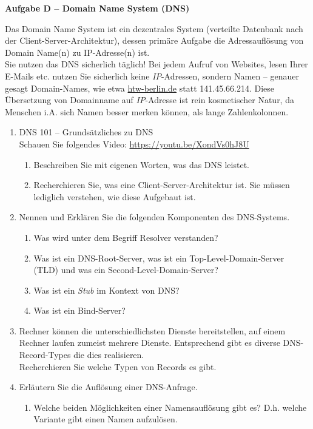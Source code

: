 \documentclass[paper=a4,fontsize=11pt]{scrartcl}%
\numberwithin{equation}{section}
\begin{document}
\begin{center}\Large{\textbf{Aufgabe D -- Domain Name System (DNS)}}\end{center}\vskip0.25in
Das Domain Name System ist ein dezentrales System (verteilte Datenbank nach der Client-Server-Architektur), dessen primäre Aufgabe die Adressauflösung von Domain Name(n) zu IP-Adresse(n) ist.\\
Sie nutzen das DNS sicherlich täglich! Bei jedem Aufruf von Websites, lesen Ihrer E-Mails etc. nutzen Sie sicherlich keine \emph{IP}-Adressen, sondern Namen -- genauer gesagt Domain-Names, wie etwa \url{htw-berlin.de} statt 141.45.66.214. Diese Übersetzung von Domainname auf \emph{IP}-Adresse ist rein kosmetischer Natur, da Menschen i.A. sich Namen besser merken können, als lange Zahlenkolonnen.
\begin{enumerate}
	\item DNS 101 -- Grundsätzliches zu DNS\\
	Schauen Sie folgendes Video: \url{https://youtu.be/XondVs0hJ8U}
	\begin{enumerate}
		\item Beschreiben Sie mit eigenen Worten, was das DNS leistet.
		\item Recherchieren Sie, was eine Client-Server-Architektur ist. Sie müssen lediglich verstehen, wie diese Aufgebaut ist.
	\end{enumerate}
	\item Nennen und Erklären Sie die folgenden Komponenten des DNS-Systems.
	\begin{enumerate}
		\item Was wird unter dem Begriff Resolver verstanden?
		\item Was ist ein DNS-Root-Server, was ist ein Top-Level-Domain-Server (TLD) und was ein Second-Level-Domain-Server?
		\item Was ist ein \emph{Stub} im Kontext von DNS?
		\item Was ist ein Bind-Server?
	\end{enumerate}
	\item Rechner können die unterschiedlichsten Dienste bereitstellen, auf einem Rechner laufen zumeist mehrere Dienste. Entsprechend gibt es diverse DNS-Record-Types die dies realisieren.\\
	Recherchieren Sie welche Typen von Records es gibt.
	\item Erläutern Sie die Auflösung einer DNS-Anfrage.
	\begin{enumerate}
		\item Welche beiden Möglichkeiten einer Namensauflösung gibt es? D.h. welche Variante gibt einen Namen aufzulösen.

\end{enumerate}
\end{enumerate}
\end{document}
